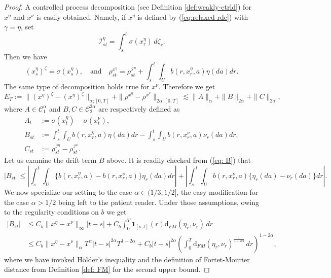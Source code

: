 \documentclass[12pt,reqno]{amsart}
\numberwithin{equation}{section}  %
\newcommand{\1}{{\bf 1}}
\newcommand{\2}{{\bf 2}}
\newcommand{\ga}{\gamma}
\newcommand{\lp}{\left(}
\newcommand{\rp}{\right)}
\theoremstyle{remark}
\theoremstyle{remark}
\begin{document}
\begin{proof}
 A controlled process decomposition (see Definition \ref{def:weakly-ctrld}) for $x^{\eta}$ and ${x}^{\nu}$ is easily obtained. Namely, if $x^{\eta}$ is defined by (\ref{eq:relaxed-rde}) with $\ga=\eta$, set 
\[\mathcal{I}_{st}^{\eta}=\int_{s}^{t}\sigma(x_{r}^{\eta}) \, d\zeta_{r}.\]
Then we have
\[ (x_{s}^{\eta})^{\zeta}=\sigma(x_{s}^{\eta}), \quad \text{and} \quad \rho^{x^{\eta}}_{st}=\rho^{\mathcal{I}^{\eta}}_{st}+\int_{s}^{t}\int_{U}b(r,x_{r}^{\eta},a)\eta(da)dr.\]
The same type of decomposition holds true for ${x}^{\nu}$. Therefore we get
\begin{equation} \label{eq: est-eq: ABC}
    E_{T}:=\|(x^{\eta})^{\zeta}-({x}^{\eta})^{\zeta}\|_{\alpha;[0,T]}+\|\rho^{x^{\eta}}-\rho^{{x}^{\nu}}\|_{2\alpha;[0,T]}\lesssim \|A\|_{\alpha} + \|B\|_{2\alpha}+\|C\|_{2\alpha} ,
\end{equation}
where $A\in \mathcal{C}_{1}^{\alpha}$ and $B, C \in \mathcal{C}_{2}^{2\alpha}$ are respectively defined as
\begin{align}
        \label{eq: A}A_{t}&:=\sigma(x^{\eta}_{t})-\sigma({x}^{\nu}_{t}),\\
        \label{eq: B}B_{st}&:=\int_{s}^{t}\int_{U}b(r,x_{r}^{\eta},a)\eta(da)dr-\int_{s}^{t}\int_{U}b(r,{x}^{\nu}_{r},a){\nu}_{r}(da)dr,\\
        \label{eq: C}C_{st}&:=\rho^{\mathcal{I}^{\eta}}_{st}-\rho^{{\mathcal{I}}^{\nu}}_{st}.
    \end{align}
    Let us examine the drift term $B$ above. It is readily checked from (\ref{eq: B}) that 
    \[|B_{st}|\leq \left|\int_{s}^{t}\int_{U}\{b(r,x_{r}^{\eta},a)-b(r,{x}_{r}^{\nu},a)\}\eta_{r}(da)dr \right| + \left|\int_{s}^{t}\int_{U}b(r,{x}_{r}^{\nu},a)\{\eta_{r}(da)-{\nu}_{r}(da)\}dr \right|. \]
    We now specialize our setting to the case $\alpha \in (1/3,1/2]$, the easy modification for the case $\alpha>1/2$ being left to the patient reader. Under those assumptions, owing to the regularity conditions on $b$ we get
    \begin{align*}
    |B_{st}|&\leq C_{b}\|x^{\eta}-x^{\nu}\|_{\infty}|t-s|+ C_{b} \int_{0}^{T}\mathbf{1}_{[s,t]}(r)\mathrm{d}_{FM}(\eta_{r},\nu_{r})\,dr\\
    & \leq  C_{b}\|x^{\eta}-x^{\nu}\|_{\alpha}T^{\alpha}|t-s|^{2\alpha}T^{1-2\alpha}+C_{b}|t-s|^{2\alpha}\lp \int_{0}^{T} \mathrm{d}_{FM}(\eta_{r},\nu_{r})^{\frac{1}{1-2\alpha}}\,dr \rp^{1-2\alpha},
        \end{align*}
        where we have invoked H\"older's inequality and the definition of Fortet-Mourier distance from Definition \ref{def: FM} for the second upper bound.

\end{proof}
\end{document}
